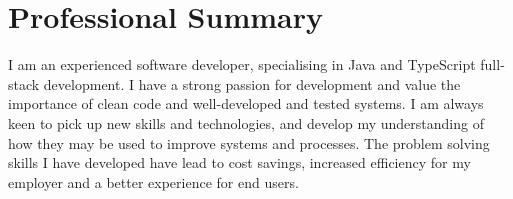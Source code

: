 \section{Professional Summary}
I am an experienced software developer, specialising in Java and TypeScript full-stack development. 
I have a strong passion for development and value the importance of clean code and well-developed and tested systems. 
I am always keen to pick up new skills and technologies, and develop my understanding of how they may be used to improve systems and processes.
The problem solving skills I have developed have lead to cost savings, increased efficiency for my employer and a better experience for end users.